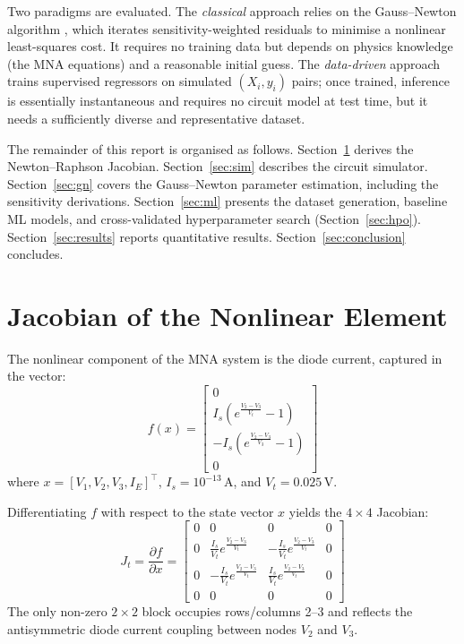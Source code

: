 \documentclass[journal,twocolumn]{IEEEtran}
\begin{document}
Two paradigms are evaluated. The \emph{classical} approach relies on the Gauss--Newton algorithm \cite{nocedal}, which iterates sensitivity-weighted residuals to minimise a nonlinear least-squares cost. It requires no training data but depends on physics knowledge (the MNA equations) and a reasonable initial guess. The \emph{data-driven} approach trains supervised regressors on simulated $(X_i, y_i)$ pairs; once trained, inference is essentially instantaneous and requires no circuit model at test time, but it needs a sufficiently diverse and representative dataset.

The remainder of this report is organised as follows. Section~\ref{sec:jac} derives the Newton--Raphson Jacobian. Section~\ref{sec:sim} describes the circuit simulator. Section~\ref{sec:gn} covers the Gauss--Newton parameter estimation, including the sensitivity derivations. Section~\ref{sec:ml} presents the dataset generation, baseline ML models, and cross-validated hyperparameter search (Section~\ref{sec:hpo}). Section~\ref{sec:results} reports quantitative results. Section~\ref{sec:conclusion} concludes.

\section{Jacobian of the Nonlinear Element}
\label{sec:jac}

The nonlinear component of the MNA system is the diode current, captured in the vector:
\begin{equation}
f(x) = \begin{bmatrix} 0 \\ I_s\!\left(e^{\frac{V_2-V_3}{V_t}}-1\right) \\ -I_s\!\left(e^{\frac{V_2-V_3}{V_3}}-1\right) \\ 0 \end{bmatrix}
\end{equation}
where $x = [V_1, V_2, V_3, I_E]^\top$, $I_s = 10^{-13}$\,A, and $V_t = 0.025$\,V.

Differentiating $f$ with respect to the state vector $x$ yields the $4\times4$ Jacobian:
\begin{equation}
J_t = \frac{\partial f}{\partial x} = \begin{bmatrix}
0 & 0 & 0 & 0 \\
0 & \frac{I_s}{V_t}e^{\frac{V_2-V_3}{V_t}} & -\frac{I_s}{V_t}e^{\frac{V_2-V_3}{V_t}} & 0 \\
0 & -\frac{I_s}{V_t}e^{\frac{V_2-V_3}{V_t}} & \frac{I_s}{V_t}e^{\frac{V_2-V_3}{V_t}} & 0 \\
0 & 0 & 0 & 0
\end{bmatrix}
\label{eq:jac}
\end{equation}
The only non-zero $2\times2$ block occupies rows/columns 2--3 and reflects the antisymmetric diode current coupling between nodes $V_2$ and $V_3$.
\end{document}
